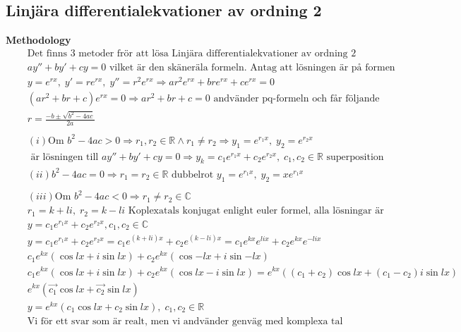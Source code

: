 \subsection{Linjära differentialekvationer av ordning 2}
\textbf{Methodology}  
\begin{align*}
  &\quad  \text{Det finns 3 metoder frör att lösa Linjära differentialekvationer av ordning 2} \\
  &\quad  ay'' + by' +cy = 0 \text{ vilket är den skäneräla formeln. Antag att lösningen är på formen} \\
  &\quad  y=e^{rx}, \; y'=re^{rx}, \; y''=r^2e^{rx} \Rightarrow ar^2e^{rx} + bre^{rx} + ce^{rx} = 0 \\
  &\quad  (ar^2+br+c)e^{rx}=0 \Rightarrow ar^2+br+c=0 \text{ andvänder pq-formeln och får följande } \\
  &\quad  r= \frac{-b\pm\sqrt{b^2-4ac}}{2a} \\
  &\quad  \\
  &\quad  (i) \text{Om } b^2-4ac > 0 \Rightarrow r_1,r_2\in\mathbb{R} \land r_1\neq r_2  \Rightarrow
  y_1=e^{r_1x}, \; y_2=e^{r_2x} \\
  &\quad  \text{ är lösningen till }  ay'' + by' +cy = 0 \Rightarrow y_k=c_1e^{r_1x} + c_2e^{r_2x},\;
  c_1,c_2\in\mathbb{R} \text{ superposition}
  &\quad  \\
  &\quad  (ii) b^2-4ac=0 \Rightarrow r_1=r_2\in\mathbb{R} \text{ dubbelrot } y_1=e^{r_1x}, \; y_2=xe^{r_1x} \\
  &\quad  \\
  &\quad  (iii) \text{Om } b^2-4ac<0 \Rightarrow r_1\neq r_2 \in\mathbb{C}  \\
  &\quad  r_1=k+li, \; r_2=k-li  \text{ Koplexatals konjugat enlight euler formel, alla lösningar är } \\
  &\quad  y=c_1e^{r_1x} + c_2e^{r_2x}, c_1,c_2 \in\mathbb{C}  \\
  &\quad  y=c_1e^{r_1x} + c_2e^{r_2x}=c_1e^{(k+li)x} + c_2e^{(k-li)x} =
  c_1e^{kx}e^{lix} + c_2e^{kx}e^{-lix} \\
  &\quad  c_1e^{kx}(\cos{lx} + i\sin{lx}) + c_2e^{kx}(\cos{-lx} + i\sin{-lx}) \\
  &\quad  c_1e^{kx}(\cos{lx} + i\sin{lx}) + c_2e^{kx}(\cos{lx} - i\sin{lx}) =
  e^{kx}((c_1+c_2)\cos{lx} + (c_1-c_2)i\sin{lx}) \\
  &\quad  e^{kx}(\vec{c_1}\cos{lx} + \vec{c_2}\sin{lx}) \\
  &\quad  y = e^{kx}(c_1\cos{lx} + c_2\sin{lx}), \; c_1,c_2\in\mathbb{R} \\
  &\quad  \text{Vi för ett svar som är realt, men vi andvänder genväg med komplexa tal}
\end{align*}


